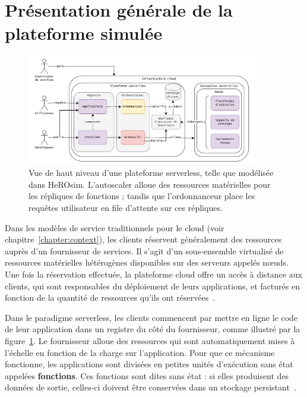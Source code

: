 \section{Présentation générale de la plateforme simulée}
\label{section:herosim-overview}

\begin{figure}[!ht]
    \centering
    \includegraphics[width=0.9\textwidth]{6_Chapitre6/figures/platform-complete.pdf}
    \caption{Vue de haut niveau d'une plateforme serverless, telle que modélisée dans HeROsim. L'autoscaler alloue des ressources matérielles pour les répliques de fonctions ; tandis que l'ordonnanceur place les requêtes utilisateur en file d'attente sur ces répliques.}
\label{figure:herosim-platform}
\end{figure}

Dans les modèles de service traditionnels pour le cloud (voir chapitre~\ref{chapter:context}), les clients réservent généralement des ressources auprès d'un fournisseur de services. Il s'agit d'un sous-ensemble virtualisé de ressources matérielles hétérogènes disponibles sur des serveurs appelés nœuds. Une fois la réservation effectuée, la plateforme cloud offre un accès à distance aux clients, qui sont responsables du déploiement de leurs applications, et facturés en fonction de la quantité de ressources qu'ils ont réservées~\cite{Lannurien2023}.

Dans le paradigme serverless, les clients commencent par mettre en ligne le code de leur application dans un registre du côté du fournisseur, comme illustré par la figure~\ref{figure:herosim-platform}. Le fournisseur alloue des ressources qui sont automatiquement mises à l'échelle en fonction de la charge sur l'application. Pour que ce mécanisme fonctionne, les applications sont divisées en petites unités d'exécution sans état appelées \textbf{fonctions}. Ces fonctions sont dites sans état : si elles produisent des données de sortie, celles-ci doivent être conservées dans un stockage persistant~\cite{yuFollowingDataNot}.

